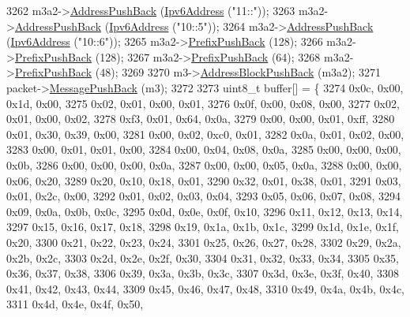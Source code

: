 \begin{DoxyCode}
3262     m3a2->\hyperlink{classns3_1_1PbbAddressBlock_a7be545a53d69bd426dbebcf752ed8371}{AddressPushBack} (\hyperlink{classns3_1_1Ipv6Address}{Ipv6Address} (\textcolor{stringliteral}{"11::"}));
3263     m3a2->\hyperlink{classns3_1_1PbbAddressBlock_a7be545a53d69bd426dbebcf752ed8371}{AddressPushBack} (\hyperlink{classns3_1_1Ipv6Address}{Ipv6Address} (\textcolor{stringliteral}{"10::5"}));
3264     m3a2->\hyperlink{classns3_1_1PbbAddressBlock_a7be545a53d69bd426dbebcf752ed8371}{AddressPushBack} (\hyperlink{classns3_1_1Ipv6Address}{Ipv6Address} (\textcolor{stringliteral}{"10::6"}));
3265     m3a2->\hyperlink{classns3_1_1PbbAddressBlock_a8e6f539ccffd043a2890396d882d0a42}{PrefixPushBack} (128);
3266     m3a2->\hyperlink{classns3_1_1PbbAddressBlock_a8e6f539ccffd043a2890396d882d0a42}{PrefixPushBack} (128);
3267     m3a2->\hyperlink{classns3_1_1PbbAddressBlock_a8e6f539ccffd043a2890396d882d0a42}{PrefixPushBack} (64);
3268     m3a2->\hyperlink{classns3_1_1PbbAddressBlock_a8e6f539ccffd043a2890396d882d0a42}{PrefixPushBack} (48);
3269 
3270     m3->\hyperlink{classns3_1_1PbbMessage_a5f623bad2fb1adde7da885e1c92d5311}{AddressBlockPushBack} (m3a2);
3271     packet->\hyperlink{classns3_1_1PbbPacket_a4a3170001ef758d9c9c4375b8f089826}{MessagePushBack} (m3);
3272 
3273     uint8\_t buffer[] = \{
3274       0x0c, 0x00, 0x1d, 0x00,
3275       0x02, 0x01, 0x00, 0x01,
3276       0x0f, 0x00, 0x08, 0x00,
3277       0x02, 0x01, 0x00, 0x02,
3278       0xf3, 0x01, 0x64, 0x0a,
3279       0x00, 0x00, 0x01, 0xff,
3280       0x01, 0x30, 0x39, 0x00,
3281       0x00, 0x02, 0xc0, 0x01,
3282       0x0a, 0x01, 0x02, 0x00,
3283       0x00, 0x01, 0x01, 0x00,
3284       0x00, 0x04, 0x08, 0x0a,
3285       0x00, 0x00, 0x00, 0x0b,
3286       0x00, 0x00, 0x00, 0x0a,
3287       0x00, 0x00, 0x05, 0x0a,
3288       0x00, 0x00, 0x06, 0x20,
3289       0x20, 0x10, 0x18, 0x01,
3290       0x32, 0x01, 0x38, 0x01,
3291       0x03, 0x01, 0x2c, 0x00,
3292       0x01, 0x02, 0x03, 0x04,
3293       0x05, 0x06, 0x07, 0x08,
3294       0x09, 0x0a, 0x0b, 0x0c,
3295       0x0d, 0x0e, 0x0f, 0x10,
3296       0x11, 0x12, 0x13, 0x14,
3297       0x15, 0x16, 0x17, 0x18,
3298       0x19, 0x1a, 0x1b, 0x1c,
3299       0x1d, 0x1e, 0x1f, 0x20,
3300       0x21, 0x22, 0x23, 0x24,
3301       0x25, 0x26, 0x27, 0x28,
3302       0x29, 0x2a, 0x2b, 0x2c,
3303       0x2d, 0x2e, 0x2f, 0x30,
3304       0x31, 0x32, 0x33, 0x34,
3305       0x35, 0x36, 0x37, 0x38,
3306       0x39, 0x3a, 0x3b, 0x3c,
3307       0x3d, 0x3e, 0x3f, 0x40,
3308       0x41, 0x42, 0x43, 0x44,
3309       0x45, 0x46, 0x47, 0x48,
3310       0x49, 0x4a, 0x4b, 0x4c,
3311       0x4d, 0x4e, 0x4f, 0x50,

\end{DoxyCode}
